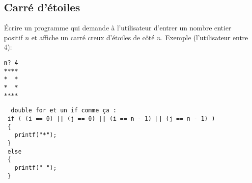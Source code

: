 \subsection{Carré d'étoiles}

Écrire un programme qui demande à l'utilisateur d'entrer un nombre
entier positif $n$ et affiche un carré creux d'étoiles de côté $n$.
Exemple (l'utilisateur entre 4):
\begin{verbatim}
n? 4
****
*  *
*  *
****
\end{verbatim}

\begin{correction}
\begin{verbatim}
  double for et un if comme ça :
 if ( (i == 0) || (j == 0) || (i == n - 1) || (j == n - 1) )
 {
   printf("*");
 }
 else
 {
   printf(" ");
 }
\end{verbatim}
\end{correction}





